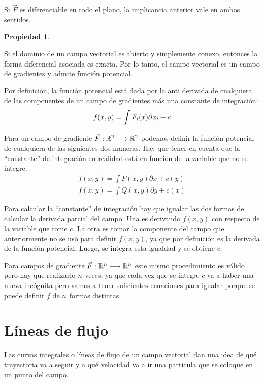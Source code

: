 \documentclass[a5paper,12pt,twoside]{book}
\newtheorem{prop}{{Propiedad}}[chapter]
\begin{document}
Si $\Vec{F}$ es diferenciable en todo el plano, la implicancia anterior vale en ambos sentidos.

\begin{mdframed}[style=PropertyFrame]
    \begin{prop}
    \end{prop}
    Si el dominio de un campo vectorial es abierto y simplemente conexo, entonces la forma diferencial asociada es exacta.
    Por lo tanto, el campo vectorial es un campo de gradientes y admite función potencial.
\end{mdframed}

Por definición, la función potencial está dada por la anti derivada de cualquiera de las componentes de un campo de gradientes más una constante de integración:
\begin{equation*}
    f(x,y) = \int F_i(\Vec{x}) \partial x_i + c
\end{equation*}

Para un campo de gradiente $\Vec{F}:\mathbb{R}^2 \longrightarrow \mathbb{R}^2$ podemos definir la función potencial de cualquiera de las siguientes dos maneras.
Hay que tener en cuenta que la ``constante'' de integración en realidad está en función de la variable que no se integre.
\begin{gather*}
    f(x,y) = \int P(x,y) \partial x + c(y)
    \\
    f(x,y) = \int Q(x,y) \partial y + c(x)
\end{gather*}

Para calcular la ``constante'' de integración hay que igualar las dos formas de calcular la derivada parcial del campo.
Una es derivando $f(x,y)$ con respecto de la variable que tome $c$.
La otra es tomar la componente del campo que anteriormente no se usó para definir $f(x,y)$, ya que por definición es la derivada de la función potencial.
Luego, se integra esta igualdad y se obtiene $c$.

Para campos de gradiente $\Vec{F}:\mathbb{R}^n \longrightarrow \mathbb{R}^n$ este mismo procedimiento es válido pero hay que realizarlo $n$ veces, ya que cada vez que se integre $c$ va a haber una nueva incógnita pero vamos a tener suficientes ecuaciones para igualar porque se puede definir $f$ de $n$ formas distintas.


\section{Líneas de flujo}

Las curvas integrales o líneas de flujo de un campo vectorial dan una idea de qué trayectoria va a seguir y a qué velocidad va a ir una partícula que se coloque en un punto del campo.
\end{document}
